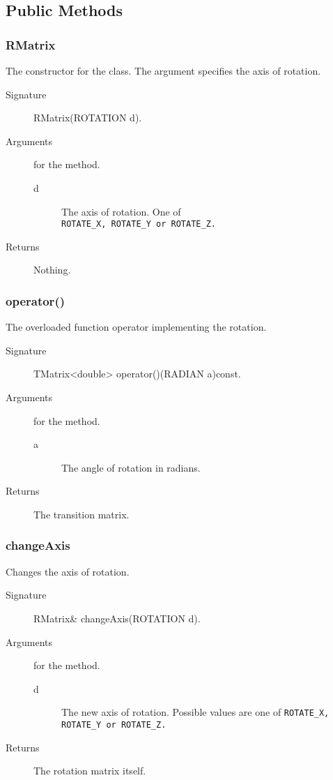 \subsection{Public Methods}
\subsubsection{RMatrix}
The constructor for the class. The argument specifies the axis 
of rotation.
 \begin{description}
    \item [Signature] RMatrix(ROTATION d).
    \item [Arguments] for the method.
      \begin{description}
        \item [d] The axis of rotation. One of \\
                       \tt ROTATE\_X\rm, \tt ROTATE\_Y \tt or 
                       \tt ROTATE\_Z\rm.
      \end{description}
    \item [Returns] Nothing.
 \end{description}
\subsubsection{operator()}
The overloaded function operator implementing the rotation.
 \begin{description}
     \item [Signature] TMatrix<double> operator()(RADIAN a)const.
    \item [Arguments] for the method.
      \begin{description}
         \item [a] The angle of rotation in radians.
      \end{description}
    \item [Returns] The transition matrix.
 \end{description}
\subsubsection{changeAxis}
Changes the axis of rotation.

 \begin{description}
    \item [Signature] RMatrix\& changeAxis(ROTATION d).
    \item [Arguments] for the method.
      \begin{description}
        \item [d] The new axis of rotation. Possible values are
                   one of \tt ROTATE\_X\rm, \tt ROTATE\_Y \rm
                 or \tt ROTATE\_Z\rm. 
      \end{description}
     \item [Returns] The rotation matrix itself.
  \end{description}

